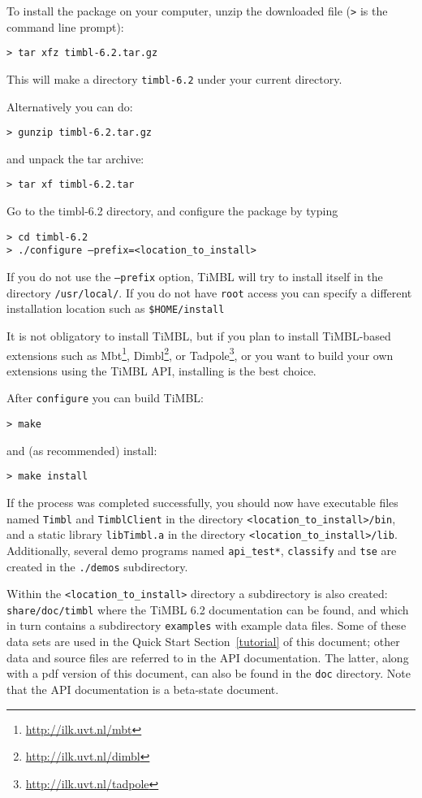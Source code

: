 \documentclass{report}
\begin{document}
To install the package on your computer, unzip the downloaded file ({\tt >} is the command line prompt):

{\tt > tar xfz timbl-6.2.tar.gz}

This will make a directory {\tt timbl-6.2} under your current directory.

Alternatively you can do:

{\tt > gunzip timbl-6.2.tar.gz}

and unpack the tar archive:

{\tt > tar xf timbl-6.2.tar}

Go to the timbl-6.2 directory, and configure the package by typing

{\tt > cd timbl-6.2} \\
{\tt > ./configure --prefix=<location\_to\_install>}

If you do not use the {\tt --prefix} option, TiMBL will try to install itself in the directory {\tt /usr/local/}.  If you do not have {\tt root} access you can specify a different installation location such as {\tt \$HOME/install}

It is not obligatory to install TiMBL, but if you plan to install TiMBL-based extensions such as Mbt\footnote{\url{http://ilk.uvt.nl/mbt}}, Dimbl\footnote{\url{http://ilk.uvt.nl/dimbl}}, or Tadpole\footnote{\url{http://ilk.uvt.nl/tadpole}}, or you want to build your own extensions using the TiMBL API, installing is the best choice.

After {\tt configure} you can build TiMBL:

{\tt > make}

and (as recommended) install:

{\tt > make install }

If the process was completed successfully, you should now have executable files
named {\tt Timbl} and {\tt TimblClient} in the directory 
{\tt <location\_to\_install>/bin}, and a static library {\tt libTimbl.a} in the
 directory {\tt <location\_to\_install>/lib}. Additionally, several demo programs named {\tt api\_test*}, {\tt classify} and {\tt tse}
are created in the {\tt ./demos} subdirectory.

Within the {\tt <location\_to\_install>} directory a subdirectory is also created: {\tt share/doc/timbl} where the TiMBL 6.2 documentation can be found, and which in turn contains a subdirectory {\tt examples} with example data files. Some of these data sets are used in the Quick Start Section~\ref{tutorial} of this document; other data and source files are referred to in the API documentation. The latter, along with a pdf version of this document, can also be found in the {\tt doc} directory. Note that the API documentation is a beta-state document.
\end{document}
